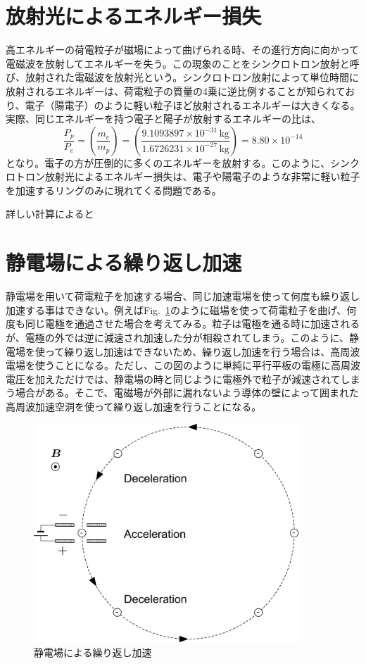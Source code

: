 \documentclass[10pt,a4paper]{ltjsarticle}
\begin{document}
\section{放射光によるエネルギー損失}
高エネルギーの荷電粒子が磁場によって曲げられる時、その進行方向に向かって電磁波を放射してエネルギーを失う。この現象のことをシンクロトロン放射と呼び、放射された電磁波を放射光という。シンクロトロン放射によって単位時間に放射されるエネルギーは、荷電粒子の質量の4乗に逆比例することが知られており、電子（陽電子）のように軽い粒子ほど放射されるエネルギーは大きくなる。実際、同じエネルギーを持つ電子と陽子が放射するエネルギーの比は、
%
\begin{equation}
  \frac{P_{p}}{P_{e}} = \left(\frac{m_e}{m_p}\right)=\left(\frac{9.1093897\times 10^{-31}\,\mathrm{kg}}{1.6726231\times 10^{-27}\,\mathrm{kg}}\right)=8.80\times 10^{-14}
  \label{eq4}
\end{equation}
%
となり。電子の方が圧倒的に多くのエネルギーを放射する。このように、シンクロトロン放射光によるエネルギー損失は、電子や陽電子のような非常に軽い粒子を加速するリングのみに現れてくる問題である。

詳しい計算によると

\section{静電場による繰り返し加速}
静電場を用いて荷電粒子を加速する場合、同じ加速電場を使って何度も繰り返し加速する事はできない。例えばFig.~\ref{dc_circular}のように磁場を使って荷電粒子を曲げ、何度も同じ電極を通過させた場合を考えてみる。粒子は電極を通る時に加速されるが、電極の外では逆に減速され加速した分が相殺されてしまう。このように、静電場を使って繰り返し加速はできないため、繰り返し加速を行う場合は、高周波電場を使うことになる。ただし、この図のように単純に平行平板の電極に高周波電圧を加えただけでは、静電場の時と同じように電極外で粒子が減速されてしまう場合がある。そこで、電磁場が外部に漏れないよう導体の壁によって囲まれた高周波加速空洞を使って繰り返し加速を行うことになる。
%
\begin{figure}[hbt]
  \begin{center}
    \includegraphics[width=10cm,clip]{dc_circular.pdf}
    \caption{静電場による繰り返し加速}
   \label{dc_circular}
  \end{center}
\end{figure}
\end{document}
